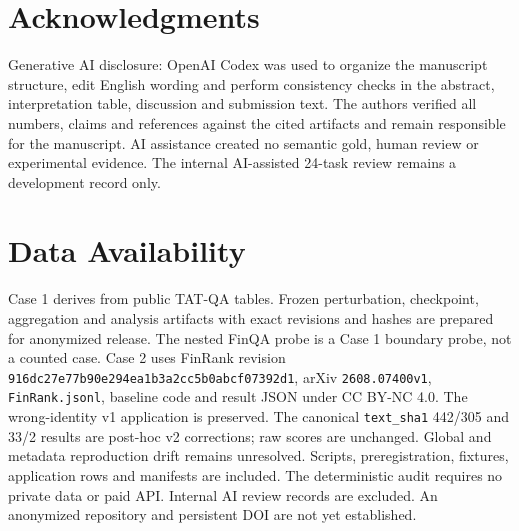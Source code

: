 \documentclass[10pt,conference]{IEEEtran}
\begin{document}
\section{Acknowledgments}
Generative AI disclosure: OpenAI Codex was used to organize the manuscript
structure, edit English wording and perform consistency checks in the abstract,
interpretation table, discussion and submission text. The authors verified all
numbers, claims and references against the cited artifacts and remain
responsible for the manuscript. AI assistance created no semantic gold, human
review or experimental evidence. The internal AI-assisted 24-task review
remains a development record only.
\section{Data Availability}
Case 1 derives from public TAT-QA tables. Frozen perturbation, checkpoint, aggregation and analysis artifacts with exact revisions and hashes are prepared for anonymized release. The nested FinQA probe is a Case 1 boundary probe, not a counted case. Case 2 uses FinRank revision \texttt{916dc27e77b90e294ea1b3a2cc5b0abcf07392d1}, arXiv \texttt{2608.07400v1}, \texttt{FinRank.jsonl}, baseline code and result JSON under CC BY-NC 4.0.
The wrong-identity v1 application is preserved. The canonical \texttt{text\_sha1} 442/305 and 33/2 results are post-hoc v2 corrections; raw scores are unchanged. Global and metadata reproduction drift remains unresolved. Scripts, preregistration, fixtures, application rows and manifests are included. The deterministic audit requires no private data or paid API. Internal AI review records are excluded. An anonymized repository and persistent DOI are not yet established.


\end{document}
